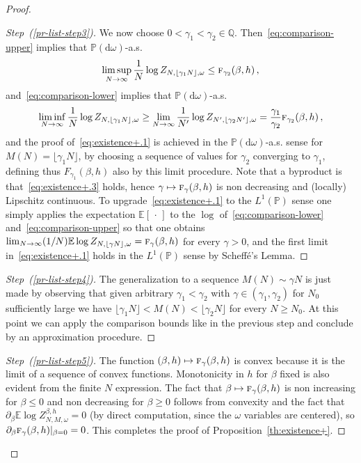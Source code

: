 \documentclass[10pt]{amsart}
\theoremstyle{definition}\newtheorem{defi}[theo]{Definition}\newtheorem{rema}[theo]{Remark}\newtheorem{exam}[theo]{Example}\newtheorem{exem}[theo]{Example}\newtheorem{nota}[theo]{Notation}
\newenvironment{step}[1]{\begin{proof}[{#1}]}{\let\qed\relax\end{proof}}
\newenvironment{laststep}[1]{\begin{proof}[{#1}]}{\end{proof}}
\newcommand{\gb}{\beta}
\newcommand{\go}{\omega}
\newcommand{\dd}{\mathrm{d}}
\newcommand{\tf}{\textsc{f}} %
\newcommand{\bbE}{\ensuremath{\mathbb{E}}}
\newcommand{\bbP}{\ensuremath{\mathbb{P}}}
\newcommand{\bbQ}{\ensuremath{\mathbb{Q}}}
\begin{document}
\begin{proof}
\begin{step}{Step~(\ref{pr-list-step3})}
We now choose $0<\gamma_1<\gamma_2 \in \bbQ$. Then~\eqref{eq:comparison-upper} implies that $\bbP(\dd \go)$-a.s.
\begin{equation}\label{eq:fclb1}
\limsup_{N \to \infty} \frac{1}{N} \log Z_{N, \lfloor \gamma_1 N \rfloor, \go} \le \tf_{\gamma_2} (\gb, h)\,,
\end{equation}
and~\eqref{eq:comparison-lower} implies that $\bbP(\dd \go)$-a.s.
\begin{equation}\label{eq:fclb2}
\liminf_{N \to \infty} \frac{1}{N} \log Z_{N, \lfloor \gamma_1 N \rfloor, \go} \ge
\lim_{N \to \infty} \frac{1}{N'}\log Z_{N', \lfloor \gamma_2 N' \rfloor, \go}= \frac{\gamma_1}{\gamma_2}
\tf_{\gamma_2}(\gb, h)
\,,
\end{equation}
and the proof of~\eqref{eq:existence+.1} is achieved in the $\bbP(\dd \go)$-a.s. sense for $M(N)= \lfloor\gamma_1 N \rfloor$, by choosing a sequence of values for $\gamma_2$ converging to $\gamma_1$, defining thus $F_{\gamma_1}(\gb, h)$ also by this limit procedure. Note that a byproduct is that~\eqref{eq:existence+.3} holds, hence $\gamma\mapsto \tf_\gamma(\gb, h)$ is non decreasing and (locally) Lipschitz continuous. To upgrade~\eqref{eq:existence+.1} to the $L^1(\bbP)$ sense one simply applies the expectation $\bbE[{\,\cdot\,}]$ to the $\log$ of~\eqref{eq:comparison-lower} and~\eqref{eq:comparison-upper} so that one obtains $\lim_{N \to \infty} (1/N) \bbE\log Z_{N, \lfloor \gamma N \rfloor, \go} = \tf_{\gamma}(\gb, h)$ for every $\gamma>0$, and the first limit in~\eqref{eq:existence+.1} holds in the $L^1(\bbP)$ sense by Scheffé's Lemma.
\end{step}



\begin{step}{Step~(\ref{pr-list-step4})}
The generalization to a sequence $M(N)\sim \gamma N$ is just made by observing that given arbitrary $\gamma_1< \gamma_2$ with $\gamma \in (\gamma_1, \gamma_2)$ for $N_0$ sufficiently large we have $\lfloor \gamma_1 N \rfloor < M(N) < \lfloor \gamma_2 N \rfloor$ for every $N \ge N_0$. At this point we can apply the comparison bounds like in the previous step and conclude by an approximation procedure.
\end{step}


\begin{laststep}{Step~(\ref{pr-list-step5})}
The function $(\beta,h) \mapsto \tf_\gamma(\beta,h)$ is convex because it is the limit of a sequence of convex functions. Monotonicity in $h$ for $\gb$ fixed is also evident from the finite $N$ expression. The fact that $\gb \mapsto \tf_\gamma(\beta,h)$ is non increasing for $\gb \le 0$ and non decreasing for $\gb \ge 0$ follows from convexity and the fact that $\partial _\gb \bbE \log Z_{N,M,\omega}^{\beta,h}=0$ (by direct computation, since the $\go$ variables are centered), so $\partial_\gb \tf_\gamma(\beta,h) \vert_{\gb=0}=0$. This completes the proof of Proposition~\ref{th:existence+}.
\end{laststep}
\let\qed\relax
\end{proof}
\goodbreak
\end{document}
